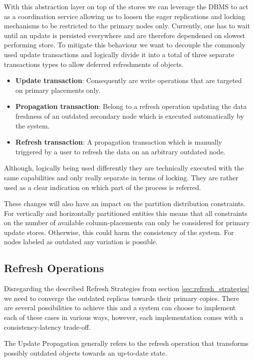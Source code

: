 With this abstraction layer on top of the stores we can leverage the DBMS to act as a coordination service allowing us to loosen the eager replications and 
locking mechanisms to be restricted to the primary nodes only. Currently, one has to wait until an update is persisted everywhere and are therefore
dependened on slowest performing store.
To mitigate this behaviour we want to decouple the commonly used update transactions and logically divide it into a total of three separate transactions types
to allow deferred refreshments of objects.
\begin{itemize}
    \item \textbf{Update transaction}: Consequently are write operations that are targeted on primary placements only.
    \item \textbf{Propagation transaction}: Belong to a refresh operation updating the data freshness of an outdated secondary node which is 
    executed automatically by the system.
    \item \textbf{Refresh transaction}: A propagation transaction which is manually triggered by a user to refresh the data on an arbitrary outdated node.
\end{itemize}

Although, logically being used differently they are technically executed with the same capabilities and only really separate in terms of locking.
They are rather used as a clear indication on which part of the process is referred.

These changes will also have an impact on the partition distribution constraints. For vertically and horizontally partitioned 
entities this means that all constraints on the number of available column-placements can only be considered for primary update stores. Otherwise, this could harm
the consistency of the system. For nodes labeled as outdated any variation is possible.


\subsection{Refresh Operations}

Disregarding the described Refresh Strategies from section \ref{sec:refresh_strategies} we need to converge the outdated replicas towards their 
primary copies.
There are several possibilities to achieve this and a system can choose to implement each of these cases in various ways, however, each implementation comes with a
consistency-latency trade-off.

The Update Propagation generally refers to the refresh operation that transforms possibly outdated objects towards an up-to-date state.

